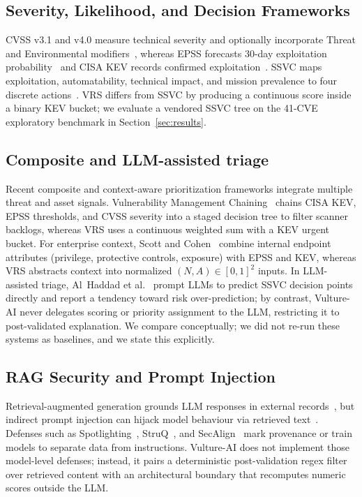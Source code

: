 \documentclass[conference]{IEEEtran}
\begin{document}
\subsection{Severity, Likelihood, and Decision Frameworks}
CVSS v3.1 and v4.0 measure technical severity and optionally incorporate Threat and Environmental modifiers~\cite{first2019cvss, first2023cvss4}, whereas EPSS forecasts 30-day exploitation probability~\cite{first2024epss, jacobs2021epss} and CISA KEV records confirmed exploitation~\cite{cisa2024kev}. SSVC maps exploitation, automatability, technical impact, and mission prevalence to four discrete actions~\cite{spring2020ssvc, cisa2024ssvc}. VRS differs from SSVC by producing a continuous score inside a binary KEV bucket; we evaluate a vendored SSVC tree on the 41-CVE exploratory benchmark in Section~\ref{sec:results}.

\subsection{Composite and LLM-assisted triage}
Recent composite and context-aware prioritization frameworks integrate multiple threat and asset signals. Vulnerability Management Chaining~\cite{shimizu2026chaining} chains CISA KEV, EPSS thresholds, and CVSS severity into a staged decision tree to filter scanner backlogs, whereas VRS uses a continuous weighted sum with a KEV urgent bucket. For enterprise context, Scott and Cohen~\cite{scott2025context} combine internal endpoint attributes (privilege, protective controls, exposure) with EPSS and KEV, whereas VRS abstracts context into normalized $(N, A) \in [0,1]^2$ inputs. In LLM-assisted triage, Al~Haddad et al.~\cite{alhaddad2025llmssvc} prompt LLMs to predict SSVC decision points directly and report a tendency toward risk over-prediction; by contrast, Vulture-AI never delegates scoring or priority assignment to the LLM, restricting it to post-validated explanation. We compare conceptually; we did not re-run these systems as baselines, and we state this explicitly.

\subsection{RAG Security and Prompt Injection}
Retrieval-augmented generation grounds LLM responses in external records~\cite{lewis2020rag}, but indirect prompt injection can hijack model behaviour via retrieved text~\cite{greshake2023indirect, liu2024formalizing}. Defenses such as Spotlighting~\cite{hines2024spotlighting}, StruQ~\cite{chen2024struq}, and SecAlign~\cite{chen2024secalign} mark provenance or train models to separate data from instructions. Vulture-AI does not implement those model-level defenses; instead, it pairs a deterministic post-validation regex filter over retrieved content with an architectural boundary that recomputes numeric scores outside the LLM.
\end{document}
